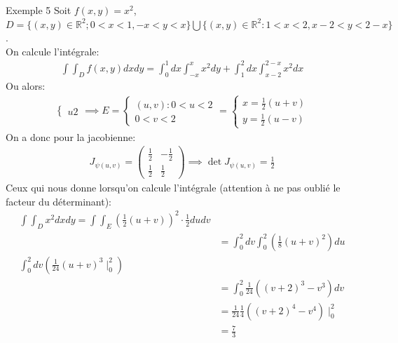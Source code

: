 \begin{parag}{Exemple 5}
	Soit $f\left(x,y\right) =  x^2$, $D =  \{\left(x,y\right) \in \mathbb{R}^{2}; 0 < x <1, -x < y < x\} \bigcup \{\left(x, y\right) \in \mathbb{R}^{2}: 1 < x < 2, x - 2 < y < 2 - x\}$.\\
	On calcule l'intégrale:
	\begin{align*} 
		\int \int_D f(x, y) dxdy =  \int_0^1 dx \int_{-x}^x x^2 dy + \int_1^2dx \int_{x-2}^{2-x}x^2dx
	\end{align*}
	Ou alors:
	\begin{align*} 
		\begin{cases}
		    u 2
		\end{cases} \implies
		E =  
		\begin{cases}
			(u, v) :  0 < u < 2\\ 0 < v < 2
		\end{cases} =
	\begin{cases}
	    x = \frac{1}{2}(u + v)\\ y =  \frac{1}{2}(u-v) 
	\end{cases}
	\end{align*}
	On a donc pour la jacobienne:
	\begin{align*} J_{\psi(u, v)} =  \begin{pmatrix} \frac{1}{2} &- \frac{1}{2} \\\frac{1}{2}  & \frac{1}{2} \end{pmatrix}  \implies \det J_{\psi (u, v)} =  \frac{1}{2}\end{align*}
	Ceux qui nous donne lorsqu'on calcule l'intégrale (attention à ne pas oublié le facteur du déterminant):
	\begin{align*} \int\int_D x^2dxdy =  \int\int_E (\frac{1}{2}(u + v))^2 \cdot  \frac{1}{2}dudv\\
		&= \int_0^2 dv \int_0^2 (\frac{1}{8}(u + v)^2)du\\
		\int_0^2 dv (\frac{1}{24}(u + v)^3\mid_0^2)\\
		&= \int_0^2 \frac{1}{24}((v + 2)^3 - v^3) dv\\
		&=  \frac{1}{24}\frac{1}{4} ((v + 2)^4 - v^4)\mid_0^2\\
		&= \frac{7}{3}
	\end{align*}
\end{parag}


